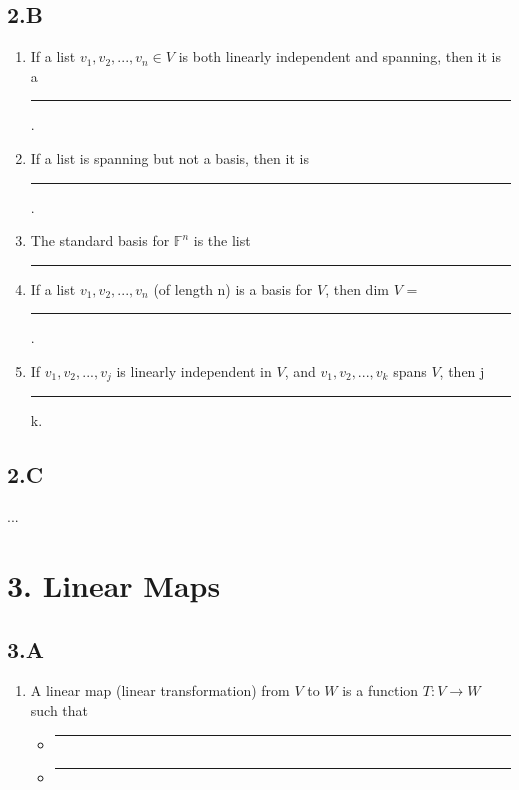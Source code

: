 \documentclass[11pt]{article}
\begin{document}
\subsection*{2.B}
\begin{enumerate}
	\item If a list $v_1, v_2, ..., v_n \in V$ is both linearly independent and spanning, then it is a \rule[0ex]{1in}{0.5pt}.
	\item If a list is spanning but not a basis, then it is \rule[0ex]{1.5in}{0.5pt}.
	\item The standard basis for $\mathbb{F}^n$ is the list \rule[0ex]{2in}{0.5pt}
	\item If a list $v_1, v_2, ..., v_n$ (of length n) is a basis for $V$, then dim $V$ = \rule[0ex]{1in}{0.5pt}.
	\item If $v_1, v_2, ..., v_j$ is linearly independent in $V$, and $v_1, v_2, ..., v_k$ spans $V$, then j \rule[0ex]{0.25in}{0.5pt} k.
	
\end{enumerate}

\subsection*{2.C}
...

\section*{3. Linear Maps}
\subsection*{3.A}
\begin{enumerate}
	\item A linear map (linear transformation) from $V$ to $W$ is a function $T: V \rightarrow W$ such that 
	\begin{itemize}
		\item \rule[0ex]{2in}{0.5pt}
		\item \rule[0ex]{2in}{0.5pt}
	\end{itemize}
\end{enumerate}
\end{document}
